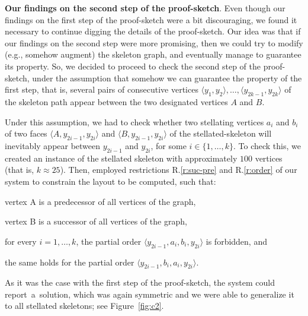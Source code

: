\documentclass[runningheads]{llncs}
\newcommand{\myparagraph}[1]{\medskip\noindent\textbf{#1}.}
\begin{document}
\myparagraph{Our findings on the second step of the proof-sketch} Even though our findings on the first step of the proof-sketch were a bit discouraging, we found it necessary to continue digging the details of the proof-sketch. Our idea was that if our findings on the second step were more promising, then we could try to modify (e.g., somehow augment) the skeleton graph, and eventually manage to guarantee its property. So, we decided to proceed to check the second step of the proof-sketch, under the assumption that somehow we can guarantee the property of the first step, that is, several pairs of consecutive vertices $\langle y_1,y_2 \rangle, \ldots, \langle y_{2k-1}, y_{2k} \rangle$ of the skeleton path appear between the two designated vertices $A$ and $B$. 

Under this assumption, we had to check whether two stellating vertices $a_i$ and $b_i$ of two faces $\langle A, y_{2i-1}, y_{2i}\rangle$ and $\langle B, y_{2i-1}, y_{2i}\rangle$ of the stellated-skeleton will inevitably appear between $y_{2i-1}$ and $y_{2i}$, for some $i\in\{1,\ldots,k\}$. To check this, we created an instance of the stellated skeleton with approximately $100$ vertices (that is, $k \approx 25$). Then, employed restrictions R.\ref{r:suc-pre} and R.\ref{r:order} of our system to constrain the layout to be computed, such that: 
%
\begin{inparaenum}[(i)]
\item vertex A is a predecessor of all vertices of the graph,
\item vertex B is a successor of all vertices of the graph,
\item for every $i=1,\ldots,k$, the partial order $\langle y_{2i-1}, a_i, b_i, y_{2i} \rangle$ is forbidden, and
\item the same holds for the partial order $\langle y_{2i-1}, b_i, a_i, y_{2i} \rangle$.
\end{inparaenum} 
%
As it was the case with the first step of the proof-sketch, the system could report~a~solution, which was again symmetric and we were able to generalize it to all stellated skeletons; see Figure~\ref{fig:c2}.
\end{document}

